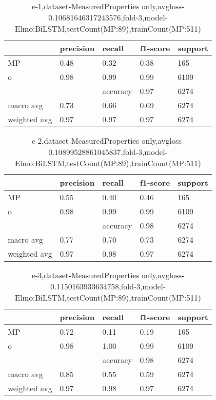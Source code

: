 \begin{table}[!ht] 
\centering
\caption{e-1,dataset-MeasuredProperties only,avgloss-0.10681646317243576,fold-3,model-Elmo:BiLSTM,testCount(MP:89),trainCount(MP:511)}\label{e-1data-mpS.tsv}
\begin{tabularx}{300pt}{|X|X|X|X|X|}
\hline
&precision&recall&f1-score&support\\
\hline
MP&0.48&0.32&0.38&165\\
\hline
o&0.98&0.99&0.99&6109\\
\hline
&&accuracy&0.97&6274\\
\hline
macro avg&0.73&0.66&0.69&6274\\
\hline
weighted avg&0.97&0.97&0.97&6274\\
\hline
\end{tabularx}
\end{table}
\begin{table}[!ht] 
\centering
\caption{e-2,dataset-MeasuredProperties only,avgloss-0.10899528861045837,fold-3,model-Elmo:BiLSTM,testCount(MP:89),trainCount(MP:511)}\label{e-2data-mpS.tsv}
\begin{tabularx}{300pt}{|X|X|X|X|X|}
\hline
&precision&recall&f1-score&support\\
\hline
MP&0.55&0.40&0.46&165\\
\hline
o&0.98&0.99&0.99&6109\\
\hline
&&accuracy&0.98&6274\\
\hline
macro avg&0.77&0.70&0.73&6274\\
\hline
weighted avg&0.97&0.98&0.97&6274\\
\hline
\end{tabularx}
\end{table}
\begin{table}[!ht] 
\centering
\caption{e-3,dataset-MeasuredProperties only,avgloss-0.1150163933634758,fold-3,model-Elmo:BiLSTM,testCount(MP:89),trainCount(MP:511)}\label{e-3data-mpS.tsv}
\begin{tabularx}{300pt}{|X|X|X|X|X|}
\hline
&precision&recall&f1-score&support\\
\hline
MP&0.72&0.11&0.19&165\\
\hline
o&0.98&1.00&0.99&6109\\
\hline
&&accuracy&0.98&6274\\
\hline
macro avg&0.85&0.55&0.59&6274\\
\hline
weighted avg&0.97&0.98&0.97&6274\\
\hline
\end{tabularx}
\end{table}
